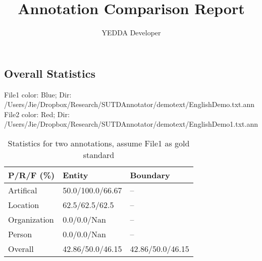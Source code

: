 \documentclass[runningheads,a4paper]{llncs}
\begin{document}
\begin{CJK*}{UTF8}{gbsn}
\mainmatter  %
\title{Annotation Comparison Report}
\author{YEDDA Developer}
\maketitle

\section{Overall Statistics}
File1 color: \colorbox{blue!30}{Blue}; Dir: \colorbox{blue!30}{/Users/Jie/Dropbox/Research/SUTDAnnotator/demotext/EnglishDemo.txt.ann}\\
File2 color: \colorbox{red!30}{Red}; Dir: \colorbox{red!30}{/Users/Jie/Dropbox/Research/SUTDAnnotator/demotext/EnglishDemo1.txt.ann}\\
\begin{table}[!htbp]
\centering
\caption{Statistics for two annotations, assume File1 as gold standard}
\begin{tabular}{l|l|l}
\hline
P/R/F (\%)& Entity &Boundary\\
\hline
Artifical& 50.0/100.0/66.67 &--\\
Location& 62.5/62.5/62.5 &--\\
Organization& 0.0/0.0/Nan &--\\
Person& 0.0/0.0/Nan &--\\
\hline
Overall& 42.86/50.0/46.15 &42.86/50.0/46.15\\
\hline
\end{tabular}
\end{table}

\end{CJK*}
\end{document}
